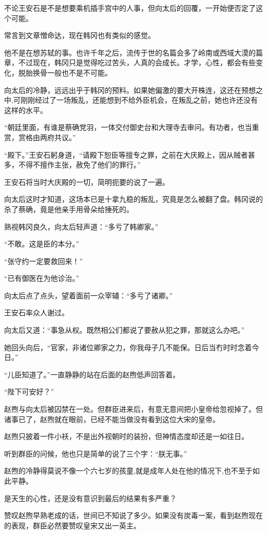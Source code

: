 不论王安石是不是想要乘机插手宫中的人事，但向太后的回覆，一开始便否定了这个可能。

常言到文章憎命达，现在韩冈也有类似的感觉。

他不是在想苏轼的事。也许千年之后，流传于世的名篇会多了岭南或西域大漠的篇章，不过现在，韩冈只是觉得吃过苦头，人真的会成长。才学，心性，都会有些变化，脱胎换骨一般也不是不可能。

向太后的冷静，远远出乎于韩冈的预料。如果她偏激的要大开株连，这还在预想之中,可刚刚经过了一场叛乱，还能想到不给外臣机会，在叛乱之前，她也许还没有这样的水平。

“朝廷里面，有谁是蔡确党羽，一体交付御史台和大理寺去审问。有功者，也当重赏，赏格由两府共议。”

“殿下。”王安石躬身道，“请殿下恕臣等擅专之罪，之前在大庆殿上，因从贼者甚多，不得不擅作主张，赦免了他们的罪行。”

王安石将当时大庆殿的一切，简明扼要的说了一遍。

向太后这时才知道，这场本已是十拿九稳的叛乱，究竟是怎么被翻了盘。韩冈说的杀了蔡确，竟是他亲手用骨朵给捶死的。

熟视韩冈良久，向太后轻声道：“多亏了韩卿家。”

“不敢。这是臣的本分。”

“张守约一定要救回来！”

“已有御医在为他诊治。”

向太后点了点头，望着面前一众宰辅：“多亏了诸卿。”

王安石率众人谢过。

向太后又道：“事急从权。既然相公们都说了要赦从犯之罪，那就这么办吧。”

她回头向后，“官家，非诸位卿家之力，你我母子几不能保。日后当冇时时念着今日。”

“儿臣知道了。”一直静静的站在后面的赵煦低声回答着。

“陛下可安好？”

赵煦与向太后被囚禁在一处。但群臣进来后，有意无意间把小皇帝给忽视掉了。但诸事已了，赵煦就在眼前，已经不能当做没有看到这位大宋的皇帝。

赵煦只披着一件小袄，不是出外视朝时的装扮，但神情态度却还是一如往日。

听到群臣的问候，他也只是简单的说了三个字：“朕无事。”

赵煦的冷静得莫说不像一个六七岁的孩童,就是成年人处在他的情况下,也不至于如此平静。

是天生的心性，还是没有意识到最后的结果有多严重？

赞叹赵煦早熟老成的话，世间已不知说了多少。如果没有炭毒一案，看到赵煦现在的表现，群臣必然要赞叹皇宋又出一英主。

